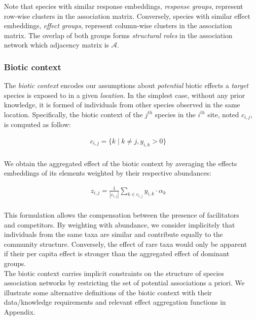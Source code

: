 \documentclass[]{article}
\begin{document}
\noindent Note that species with similar response embeddings, \textit{response groups}, represent row-wise clusters in the association matrix. Conversely, species with similar effect embeddings, \textit{effect groups}, represent column-wise clusters in the association matrix. The overlap of both groups forms \textit{structural roles} in the association network which adjacency matrix is $\mathcal{A}$.  

\subsubsection{Biotic context}
The \textit{biotic context} encodes our assumptions about \textit{potential} biotic effects a \textit{target} species is exposed to in a given \textit{location}. In the simplest case, without any prior knowledge, it is formed of individuals from other species observed in the same location. Specifically, the biotic context of the $j^{th}$ species in the $i^{th}$ site, noted $c_{i,j}$, is computed as follow:

\begin{equation*}
\begin{matrix}
c_{i,j} = \{k \mid k\neq j , y_{i,k}>0 \}\\
\end{matrix}
\end{equation*}

\noindent We obtain the aggregated effect of the biotic context by averaging the effects embeddings of its elements weighted by their respective abundances:   

\begin{equation*}
\begin{matrix}
z_{i,j} = \frac{1}{|c_{i,j}|}\sum_{k \in c_{i,j}} y_{i,k} \cdot \alpha_{k}\\
\end{matrix}
\end{equation*}

\noindent This formulation allows the compensation between the presence of facilitators and competitors. By weighting with abundance, we consider implicitely that individuals from the same taxa are similar and contribute equally to the community structure. Conversely, the effect of rare taxa would only be apparent if their per capita effect is stronger than the aggregated effect of dominant groups.\\

\noindent The biotic context carries implicit constraints on the structure of species association networks by restricting the set of potential associations a priori. We illustrate some alternative definitions of the biotic context with their data/knowledge requirements and relevant effect aggregation functions in Appendix. 
\end{document}
